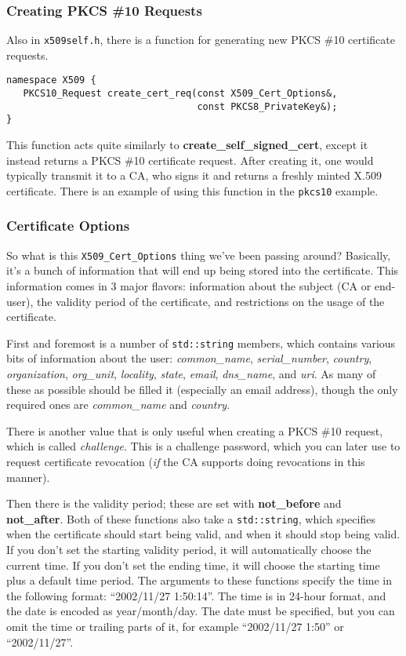 \documentclass{article}
\newcommand{\filename}[1]{\texttt{#1}}
\newcommand{\function}[1]{\textbf{#1}}
\newcommand{\type}[1]{\texttt{#1}}
\renewcommand{\arg}[1]{\textsl{#1}}
\begin{document}
\subsubsection{Creating PKCS \#10 Requests}

Also in \filename{x509self.h}, there is a function for generating new PKCS \#10
certificate requests.

\begin{verbatim}
namespace X509 {
   PKCS10_Request create_cert_req(const X509_Cert_Options&,
                                  const PKCS8_PrivateKey&);
}
\end{verbatim}

This function acts quite similarly to \function{create\_self\_signed\_cert},
except it instead returns a PKCS \#10 certificate request. After creating it,
one would typically transmit it to a CA, who signs it and returns a freshly
minted X.509 certificate. There is an example of using this function in the
\filename{pkcs10} example.

\subsubsection{Certificate Options}

So what is this \type{X509\_Cert\_Options} thing we've been passing around?
Basically, it's a bunch of information that will end up being stored into the
certificate. This information comes in 3 major flavors: information about the
subject (CA or end-user), the validity period of the certificate, and
restrictions on the usage of the certificate.

First and foremost is a number of \type{std::string} members, which contains
various bits of information about the user: \arg{common\_name},
\arg{serial\_number}, \arg{country}, \arg{organization}, \arg{org\_unit},
\arg{locality}, \arg{state}, \arg{email}, \arg{dns\_name}, and \arg{uri}. As
many of these as possible should be filled it (especially an email address),
though the only required ones are \arg{common\_name} and \arg{country}.

There is another value that is only useful when creating a PKCS \#10 request,
which is called \arg{challenge}. This is a challenge password, which you can
later use to request certificate revocation (\emph{if} the CA supports doing
revocations in this manner).

Then there is the validity period; these are set with \function{not\_before}
and \function{not\_after}. Both of these functions also take a
\type{std::string}, which specifies when the certificate should start being
valid, and when it should stop being valid. If you don't set the starting
validity period, it will automatically choose the current time. If you don't
set the ending time, it will choose the starting time plus a default time
period. The arguments to these functions specify the time in the following
format: ``2002/11/27 1:50:14''. The time is in 24-hour format, and the date is
encoded as year/month/day. The date must be specified, but you can omit the
time or trailing parts of it, for example ``2002/11/27 1:50'' or
``2002/11/27''.
\end{document}
